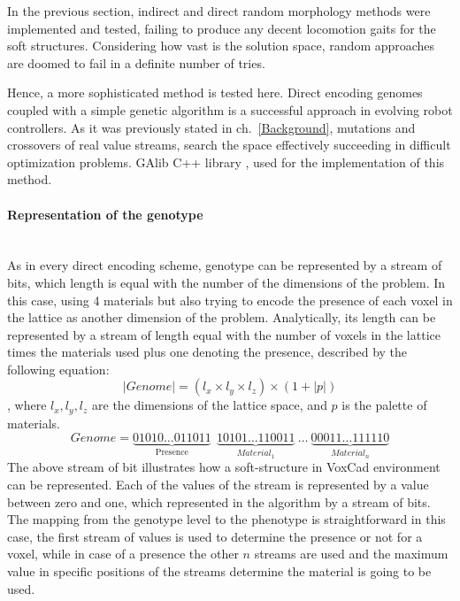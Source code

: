 In the previous section, indirect and direct random morphology methods were implemented and tested, failing to produce any decent locomotion gaits for the soft structures. Considering how vast is the solution space, random approaches are doomed to fail in a definite number of tries. 

Hence, a more sophisticated method is tested here. Direct encoding genomes coupled with a simple genetic algorithm is a successful approach in evolving robot controllers. As it was previously stated in ch.~\ref{Background}, mutations and crossovers of real value streams, search the space effectively succeeding in difficult optimization problems. GAlib C++ library \cite{wall1996galib}, used for the implementation of this method.

\paragraph*{Representation of the genotype}~\\
As in every direct encoding scheme, genotype can be represented by a stream of bits, which length is equal with the number of the dimensions of the problem. In this case, using 4 materials but also trying to encode the presence of each voxel in the lattice as another dimension of the problem. Analytically, its length can be represented by a stream of length equal with the number of voxels in the lattice times the materials used plus one denoting the presence, described by the following equation:
\begin{equation}
\label{lengthDirect}
| Genome | = (l_x \times l_y \times l_z ) \times (1 + |p|)
\end{equation}
, where $l_x, l_y, l_z$ are the dimensions of the lattice space, and $p$ is the palette of materials.
\begin{equation*}
Genome = \underbrace{01010\ldots011011}_\text{Presence}\ \    \underbrace{10101\ldots110011}_{Material_1} \   \ldots\  \underbrace{00011\ldots111110}_{Material_n}
\end{equation*}
The above stream of bit illustrates how a soft-structure in VoxCad environment can be represented. Each of the values of the stream is represented by a value between zero and one, which represented 
in the algorithm by a stream of bits. The mapping from the genotype level to the phenotype is straightforward in this case, the first stream of values is used to determine the presence or not for a voxel, while in case of a presence the other $n$ streams are used and the maximum value in specific positions of the streams determine the material is going to be used.


